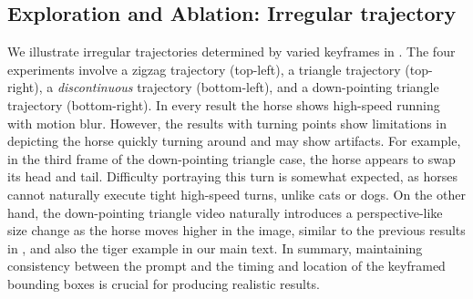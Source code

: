 \newpage
\subsection{Exploration and Ablation: Irregular trajectory}



We illustrate irregular trajectories determined by varied keyframes in . The four experiments involve a zigzag trajectory (top-left), a triangle trajectory (top-right), a \emph{discontinuous} trajectory (bottom-left), and a down-pointing triangle trajectory (bottom-right). In every result the horse shows high-speed running with motion blur. However, the results with turning points show limitations in depicting the horse quickly turning around and may show artifacts. For example, in the third frame of the down-pointing triangle case, the horse appears to swap its head and tail. Difficulty portraying this turn is somewhat expected, as horses cannot naturally execute tight high-speed turns, unlike cats or dogs. On the other hand, the down-pointing triangle video naturally introduces a perspective-like size change as the horse moves higher in the image,
similar to the previous results in , and also the tiger example  in our main text. In summary, maintaining consistency between the prompt and the timing and location of the keyframed bounding boxes is crucial for producing realistic results.

